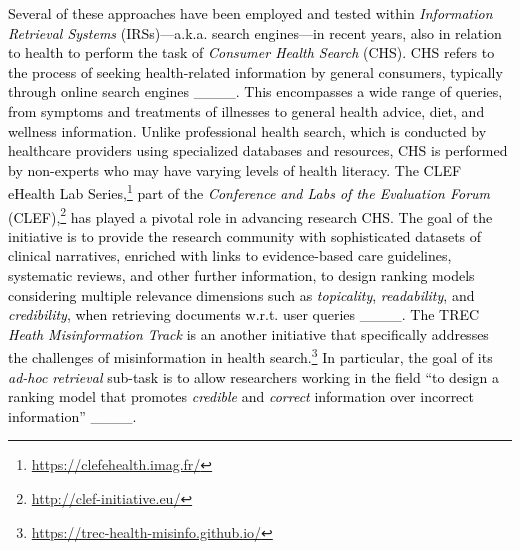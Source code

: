 \textcolor{black}{Several of these approaches have been employed and tested within \textit{Information Retrieval Systems} (IRSs)\textcolor{black}{—a.k.a. search engines—}in recent years, also in relation to health to perform the task of \textit{Consumer Health Search} (CHS). CHS refers to the process of seeking health-related information by general consumers, typically through online search engines ____. This encompasses a wide range of queries, from symptoms and treatments of illnesses to general health advice, diet, and wellness information. Unlike professional health search, which is conducted by healthcare providers using specialized databases and resources, CHS is performed by non-experts who may have varying levels of health literacy. The CLEF eHealth Lab Series,\footnote{\url{https://clefehealth.imag.fr/}} part of the \textit{Conference and Labs of the Evaluation Forum} (CLEF),\footnote{\url{http://clef-initiative.eu/}} has played a pivotal role in advancing research CHS. The goal of the initiative is to provide the research community with sophisticated datasets of clinical narratives, enriched with links to evidence-based care guidelines, systematic reviews, and other further information, to design ranking models considering multiple relevance dimensions such as \textit{topicality}, \textit{readability}, and \textit{credibility}, when retrieving documents w.r.t. user queries ____.} \textcolor{black}{The TREC \textit{Heath Misinformation Track} \textcolor{black}{is an another initiative that specifically addresses the challenges of misinformation in health search.\footnote{\url{https://trec-health-misinfo.github.io/}} In particular, the goal of its \textit{ad-hoc retrieval} sub-task is to allow researchers working in the field} ``to design a ranking model that promotes \textit{credible} and \textit{correct} information over incorrect information'' ____.}

